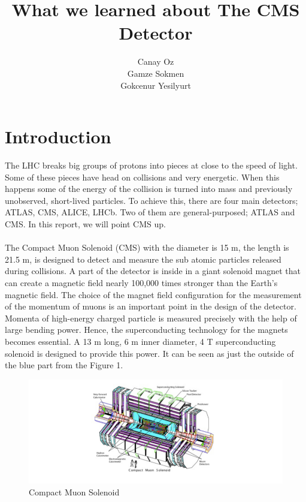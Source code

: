 \documentclass[a4paper,10pt]{article}
\title{ What we learned about The CMS Detector}
\author{Canay Oz\\Gamze Sokmen \\ Gokcenur Yesilyurt}
\begin{document}
\maketitle

\section{Introduction}

The LHC breaks big groups of protons into pieces at close to the speed of light. Some of these pieces have head on collisions and very energetic. When this happens some of the energy of the collision is turned into mass and previously unobserved, short-lived particles.
To achieve this, there are four main detectors; ATLAS, CMS, ALICE, LHCb. Two of them are general-purposed; ATLAS and CMS. In this report, we will point CMS up.
\\\\
The Compact Muon Solenoid (CMS) with the diameter is 15 m, the length is 21.5 m, is designed to detect and measure the sub atomic particles released during collisions. A part of the detector is inside in a giant solenoid magnet that can create a magnetic field nearly 100,000 times stronger than the Earth's magnetic field. 
The choice of the magnet field configuration for the measurement of the momentum of muons is an important point in the design of the detector. Momenta of high-energy charged particle is measured precisely with the help of large bending power. Hence, the superconducting technology for the magnets becomes essential. A 13 m long, 6 m inner diameter,
4 T superconducting solenoid is designed to provide this power. It can be seen as just the outside of the blue part from the Figure 1. 
\begin{figure}[H]
\begin{center}
\includegraphics[width=13cm]{a1.png}
\end{center}
\caption{Compact Muon Solenoid }
\end{figure}
\end{document}
